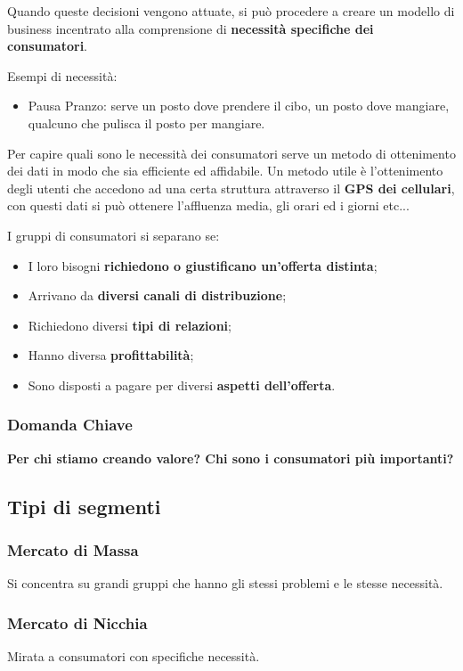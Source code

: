 \documentclass[twocolumn]{article}
\begin{document}
Quando queste decisioni vengono attuate, si può procedere a creare un modello di business incentrato alla comprensione di \textbf{necessità specifiche dei consumatori}.

Esempi di necessità:\begin{itemize}
    \item Pausa Pranzo: serve un posto dove prendere il cibo, un posto dove mangiare, qualcuno che pulisca il posto per mangiare.
\end{itemize}

Per capire quali sono le necessità dei consumatori serve un metodo di ottenimento dei dati in modo che sia efficiente ed affidabile. Un metodo utile è l'ottenimento degli utenti che accedono ad una certa struttura attraverso il \textbf{GPS dei cellulari}, con questi dati si può ottenere l'affluenza media, gli orari ed i giorni etc...

I gruppi di consumatori si separano se:\begin{itemize}
    \item I loro bisogni \textbf{richiedono o giustificano un'offerta distinta};
    \item Arrivano da \textbf{diversi canali di distribuzione};
    \item Richiedono diversi \textbf{tipi di relazioni};
    \item Hanno diversa \textbf{profittabilità};
    \item Sono disposti a pagare per diversi \textbf{aspetti dell'offerta}.
\end{itemize}
\subsubsection{Domanda Chiave}
\textbf{Per chi stiamo creando valore? \newline Chi sono i consumatori più importanti?}
\subsection{Tipi di segmenti}
\subsubsection{Mercato di Massa}
Si concentra su grandi gruppi che hanno gli stessi problemi e le  stesse necessità.
\subsubsection{Mercato di Nicchia}
Mirata a consumatori con specifiche necessità.
\end{document}
